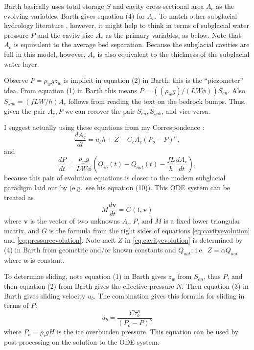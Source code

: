 \documentclass[11pt,final]{amsart}%
\newcommand\bv{\mathbf{v}}
\begin{document}
Barth basically uses total storage $S$ and cavity cross-sectional area $A_c$ as the evolving variables.  Barth gives equation (4) for $A_c$.  To match other subglacial hydrology literature \citep[for example]{Hewitt2011}, however, it might help to think in terms of subglacial water pressure $P$ and the cavity size $A_c$ as the primary variables, as below.  Note that $A_c$ is equivalent to the average bed separation.  Because the subglacial cavities are full in this model, however, $A_c$ is also equivalent to the thickness of the subglacial water layer.

Observe $P = \rho_w g z_w$ is implicit in equation (2) in Barth; this is the ``piezometer'' idea.  From equation (1) in Barth this means $P = ((\rho_w g)/(LW\phi)) S_{en}$.  Also $S_{sub} = (fLW/h) A_c$ follows from reading the text on the bedrock bumps.  Thus, given the pair $A_c,P$ we can recover the pair $S_{en},S_{sub}$, and vice-versa.

I suggest actually using these equations from my Correspondence \citep{Bueler2014correspondence}:
\begin{equation}
\frac{dA_c}{dt} = u_b h + Z - C_c A_c (P_o-P)^n,  \label{eq:cavityevolution}
\end{equation}
and
\begin{equation}
\frac{dP}{dt} = \frac{\rho_w g}{L W \phi} \left(Q_{in}(t) - Q_{out}(t) - \frac{f L }{h} \frac{d A_c}{dt}\right), \label{eq:pressureevolution}
\end{equation}
because this pair of evolution equations is closer to the modern subglacial paradigm laid out by \cite{Hewitt2011} (e.g.~see his equation (10)).  This ODE system can be treated as
\begin{equation}
M \frac{d\bv}{dt} = G(t,\bv) \label{eq:system}
\end{equation}
where $\mathbf{v}$ is the vector of two unknowns $A_c,P$, and $M$ is a fixed lower triangular matrix, and $G$ is the formula from the right sides of equations \eqref{eq:cavityevolution} and \eqref{eq:pressureevolution}.  Note melt $Z$ in \eqref{eq:cavityevolution} is determined by (4) in Barth from geometric and/or known constants and $Q_{out}$; i.e.~$Z=\alpha Q_{out}$ where $\alpha$ is constant.

To determine sliding, note equation (1) in Barth gives $z_w$ from $S_{en}$, thus $P$, and then equation (2) from Barth gives the effective pressure $N$.  Then equation (3) in Barth gives sliding velocity $u_b$.  The combination gives this formula for sliding in terms of $P$:
\begin{equation}
u_b = \frac{C \tau_b^n}{(P_o - P)^\gamma} \label{eq:sliding}
\end{equation}
where $P_o=\rho_i g H$ is the ice overburden pressure.  This equation can be used by post-processing on the solution to the ODE system.
\end{document}
